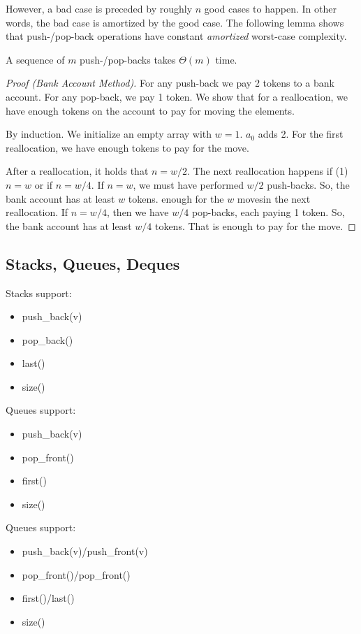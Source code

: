 However, a bad case is preceded by roughly $n$ good cases to happen. In other words, the bad case is amortized by the good case. The following lemma shows that push-/pop-back operations have constant \emph{amortized} worst-case complexity.

\begin{mylemma}
A sequence of $m$ push-/pop-backs takes $\Theta(m)$ time.
\end{mylemma}
\begin{proof}[Proof (Bank Account Method)]
For any push-back we pay 2 tokens to a bank account. For any pop-back, we pay 1 token. We show that for a reallocation, we have enough tokens on the account to pay for moving the elements.

By induction. We initialize an empty array with $w=1$. $a_0$ adds 2. For the first reallocation, we have enough tokens to pay for the move.

After a reallocation, it holds that $n = w/2$. The next reallocation happens if (1) $n = w$ or if $n = w/4$. If $n=w$, we must have performed $w/2$ push-backs.
So, the bank account has at least $w$ tokens. enough for the $w$ movesin the next reallocation. If $n = w/4$, then we have $w/4$ pop-backs, each paying 1 token. So, the bank account has at least $w/4$ tokens. That is enough to pay for the move.
\end{proof}

\newpage

\subsection{Stacks, Queues, Deques}

\noindent Stacks support:
\begin{itemize}
\item push\_back(v)
\item pop\_back()
\item last()
\item size()
\end{itemize}

\noindent Queues support:
\begin{itemize}
\item push\_back(v)
\item pop\_front()
\item first()
\item size()
\end{itemize}

\noindent Queues support:
\begin{itemize}
\item push\_back(v)/push\_front(v)
\item pop\_front()/pop\_front()
\item first()/last()
\item size()
\end{itemize}

